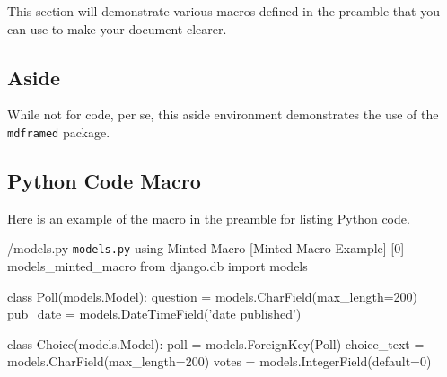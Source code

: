 
This section will demonstrate various macros defined in the preamble that you can use to make your document clearer.

\subsection{Aside}

While not for code, per se, this aside environment demonstrates the use of the \verb|mdframed| package.

\begin{aside}
\lipsum[2] %
\end{aside}

\subsection{Python Code Macro}
Here is an example of the macro in the preamble for listing Python code.

\begin{pycode}%
      {/models.py}
      {\texttt{models.py} using Minted Macro}%
      [Minted Macro Example]%
      [0]%
      {models_minted_macro}
from django.db import models

class Poll(models.Model):
    question = models.CharField(max_length=200)
    pub_date = models.DateTimeField('date published')

class Choice(models.Model):
    poll = models.ForeignKey(Poll)
    choice_text = models.CharField(max_length=200)
    votes = models.IntegerField(default=0)
\end{pycode}
